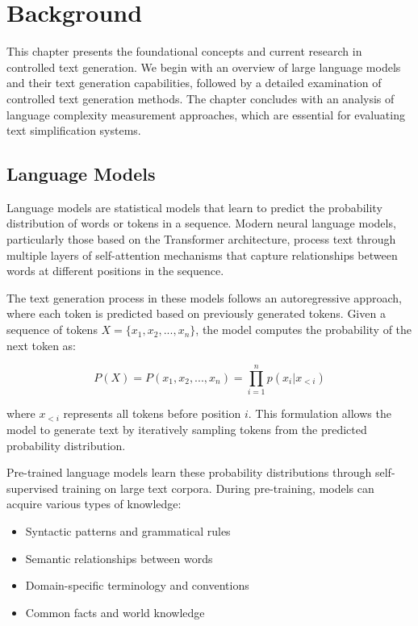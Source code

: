 \chapter{Background}
\label{c2}

This chapter presents the foundational concepts and current research in controlled text generation. We begin with an overview of large language models and their text generation capabilities, followed by a detailed examination of controlled text generation methods. The chapter concludes with an analysis of language complexity measurement approaches, which are essential for evaluating text simplification systems.

\section{Language Models}
\label{c2:s:language-models}

Language models are statistical models that learn to predict the probability distribution of words or tokens in a sequence. Modern neural language models, particularly those based on the Transformer architecture, process text through multiple layers of self-attention mechanisms that capture relationships between words at different positions in the sequence.

The text generation process in these models follows an autoregressive approach, where each token is predicted based on previously generated tokens. Given a sequence of tokens $X = \{x_1, x_2, ..., x_n\}$, the model computes the probability of the next token as:

\begin{equation}
    P(X) = P(x_1, x_2, ..., x_n) = \prod_{i=1}^n p(x_i|x_{<i})
\end{equation}

where $x_{<i}$ represents all tokens before position $i$. This formulation allows the model to generate text by iteratively sampling tokens from the predicted probability distribution.

Pre-trained language models learn these probability distributions through self-supervised training on large text corpora. During pre-training, models can acquire various types of knowledge:

\begin{itemize}
    \item Syntactic patterns and grammatical rules
    \item Semantic relationships between words
    \item Domain-specific terminology and conventions
    \item Common facts and world knowledge
\end{itemize}

